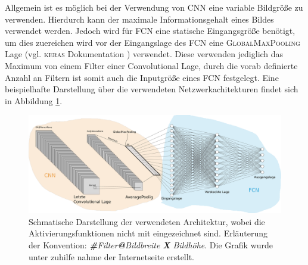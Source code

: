 Allgemein ist es möglich bei der Verwendung von CNN eine variable Bildgröße
zu verwenden. Hierdurch kann der maximale Informationsgehalt eines Bildes
verwendet werden. Jedoch wird für FCN eine statische Eingangsgröße benötigt,
um dies zuereichen wird vor der Eingangslage des FCN eine \textsc{GlobalMaxPooling}
Lage (vgl. \textsc{keras} Dokumentation \cite{keras_max_pooling}) verwendet.
Diese verwenden jediglich das Maximum von einem Filter einer Convolutional Lage,
durch die vorab definierte Anzahl an Filtern ist somit auch die Inputgröße eines
FCN festgelegt.
Eine beispielhafte Darstellung über die verwendeten Netzwerkachitekturen findet sich
in Abbildung \ref{fig:beispielhafte_netz_architecture}.
\begin{figure}
\centering
\includegraphics[width=\the\textwidth]{../../final_data/general/sample_network.pdf}
\caption{Schmatische Darstellung der verwendeten Architektur, wobei
         die Aktivierungsfunktionen nicht mit eingezeichnet sind. Erläuterung der Konvention: \emph{\textbf{\#}Filter\textbf{@}Bildbreite \textbf{X} Bildhöhe}.
         Die Grafik wurde unter zuhilfe nahme der Internetseite \cite{net_svg_source} erstellt.}
\label{fig:beispielhafte_netz_architecture}
\end{figure}

